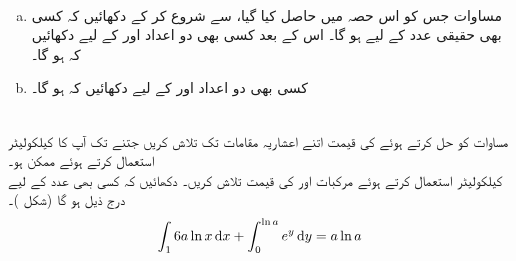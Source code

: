 \\
\begin{enumerate}[a.]
\item
مساوات  جس کو اس حصہ میں حاصل کیا گیا، سے شروع کر کے دکھائیں کہ کسی بھی حقیقی عدد  کے لیے  ہو گا۔ اس کے بعد کسی بھی دو اعداد  اور  کے لیے دکھائیں کہ  ہو گا۔
\item
کسی بھی دو اعداد  اور  کے لیے دکھائیں کہ  ہو گا۔
\end{enumerate}
\\
مساوات کو حل کرتے ہوئے  کی قیمت اتنے اعشاریہ مقامات  تک تلاش کریں جتنے تک آپ کا کیلکولیٹر استعمال کرتے ہوئے ممکن ہو۔
\\
کیلکولیٹر استعمال کرتے ہوئے مرکبات  اور  کی قیمت تلاش کریں۔
دکھائیں کہ کسی بھی عدد  کے لیے درج ذیل ہو گا (شکل )۔
\begin{align*}
\int_16a\ln x\dif x+\int_0^{\ln a}e^y\dif y=a\ln a
\end{align*}
